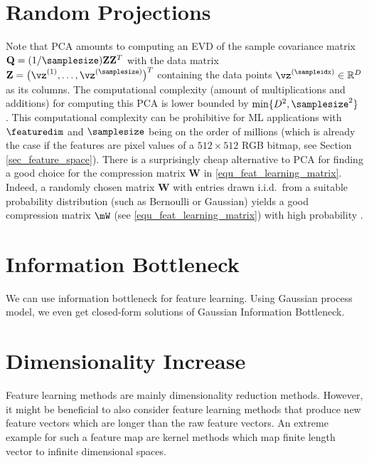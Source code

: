 \documentclass[12pt]{report}
\begin{document}
\section{Random Projections} 
Note that PCA amounts to computing an EVD of the sample covariance matrix 
$\mathbf{Q} = (1/\samplesize) \mathbf{Z} \mathbf{Z}^{T}$ with the data matrix 
$\mathbf{Z} = \big(\vz^{(1)},\ldots,\vz^{(\samplesize)}\big)^{T}$ containing the 
data points $\vz^{(\sampleidx)} \in \mathbb{R}^{D}$ as its columns. The computational 
complexity (amount of multiplications and additions) for computing this PCA is lower 
bounded by $\min\{ D^{2}, \samplesize^{2} \}$ \cite{Du08low-complexityprincipal,Sharma2007}. 
This computational complexity can be prohibitive for ML applications with $\featuredim$ 
and $\samplesize$ being on the order of millions (which is already the case if the features 
are pixel values of a $512 \times 512$ RGB bitmap, see Section \ref{sec_feature_space}). 
There is a surprisingly cheap alternative to PCA for finding a good choice for the 
compression matrix $\mathbf{W}$ in \eqref{equ_feat_learning_matrix}. Indeed, a randomly 
chosen matrix $\mathbf{W}$ with entries drawn i.i.d.\ from a suitable probability distribution 
(such as Bernoulli or Gaussian) yields a good compression matrix $\mW$ (see \eqref{equ_feat_learning_matrix}) 
with high probability \cite{Bingham01randomprojection,jung-specesttit}. 


\section{Information Bottleneck}
We can use information bottleneck for feature learning. Using Gaussian process model, we even 
get closed-form solutions of Gaussian Information Bottleneck. 


\section{Dimensionality Increase} 
\label{sec_dim_increas} 

Feature learning methods are mainly dimensionality reduction methods. However, it might be 
beneficial to also consider feature learning methods that produce new feature vectors which 
are longer than the raw feature vectors. An extreme example for such a feature map are kernel 
methods which map finite length vector to infinite dimensional spaces. 
\end{document}
